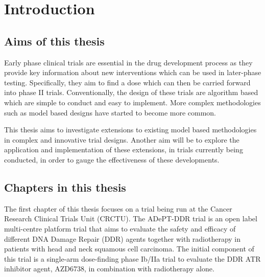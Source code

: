 
\chapter{Introduction} %

\label{Chapter1} %

\section{Aims of this thesis}
Early phase clinical trials are essential in the drug development process as they provide key information about new interventions which can be used in later-phase testing. Specifically, they aim to find a dose which can then be carried forward into phase II trials. Conventionally, the design of these trials are algorithm based which are simple to conduct and easy to implement. More complex methodologies such as model based designs have started to become more common. 

This thesis aims to investigate extensions to existing model based methodologies in complex and innovative trial designs. Another aim will be to explore the application and implementation of these extensions, in trials currently being conducted, in order to gauge the effectiveness of these developments. 



\section{Chapters in this thesis}

The first chapter of this thesis focuses on a trial being run at the Cancer Research Clinical Trials Unit (CRCTU). The ADePT-DDR trial is an open label multi-centre platform trial that aims to evaluate the safety and efficacy of different DNA Damage Repair (DDR) agents together with radiotherapy in patients with head and neck squamous cell carcinoma. The initial component of this trial is a single-arm dose-finding phase Ib/IIa trial to evaluate the DDR ATR inhibitor agent, AZD6738, in combination with radiotherapy alone.

